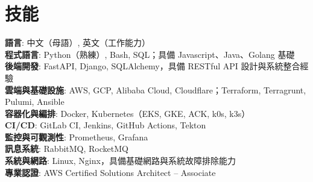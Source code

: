 \documentclass[letterpaper,11pt]{article}
\begin{document}
\section{技能}
 \begin{itemize}[leftmargin=0in, label={}]
    \small{\item{
     \textbf{語言}{: 中文（母語）, 英文（工作能力）} \\
     \textbf{程式語言}{: Python（熟練）, Bash, SQL；具備 Javascript、Java、Golang 基礎} \\
     \textbf{後端開發}{: FastAPI, Django, SQLAlchemy，具備 RESTful API 設計與系統整合經驗} \\
     \textbf{雲端與基礎設施}{: AWS, GCP, Alibaba Cloud, Cloudflare；Terraform, Terragrunt, Pulumi, Ansible} \\
     \textbf{容器化與編排}{: Docker, Kubernetes（EKS, GKE, ACK, k0s, k3s）} \\
     \textbf{CI/CD}{: GitLab CI, Jenkins, GitHub Actions, Tekton} \\
     \textbf{監控與可觀測性}{: Prometheus, Grafana} \\
     \textbf{訊息系統}{: RabbitMQ, RocketMQ} \\
     \textbf{系統與網路}{: Linux, Nginx，具備基礎網路與系統故障排除能力} \\
     \textbf{專業認證}{: AWS Certified Solutions Architect – Associate}
    }}
 \end{itemize}


\end{document}
